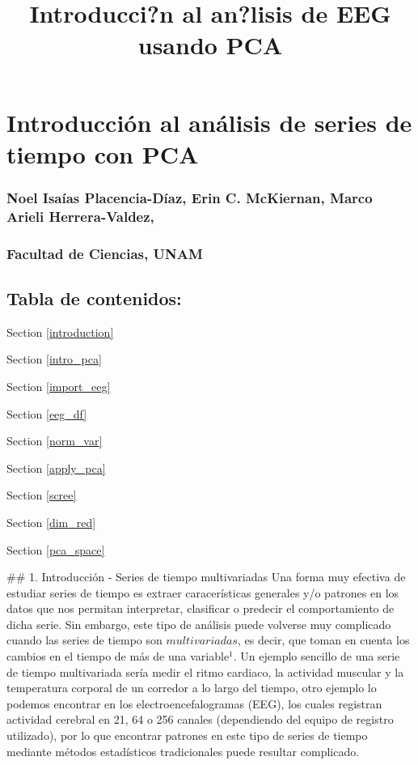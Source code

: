 \documentclass[11pt]{article}
\title{Introducci?n al an?lisis de EEG usando PCA}
\begin{document}
    
    
    \maketitle
    
    

    
    \hypertarget{introducciuxf3n-al-anuxe1lisis-de-series-de-tiempo-con-pca}{%
\section{Introducción al análisis de series de tiempo con
PCA}\label{introducciuxf3n-al-anuxe1lisis-de-series-de-tiempo-con-pca}}

\hypertarget{noel-isauxedas-placencia-duxedaz-erin-c.-mckiernan-marco-arieli-herrera-valdez}{%
\subsubsection{Noel Isaías Placencia-Díaz, Erin C. McKiernan, Marco
Arieli
Herrera-Valdez,}\label{noel-isauxedas-placencia-duxedaz-erin-c.-mckiernan-marco-arieli-herrera-valdez}}

\hypertarget{facultad-de-ciencias-unam}{%
\subsubsection{Facultad de Ciencias,
UNAM}\label{facultad-de-ciencias-unam}}

    \hypertarget{tabla-de-contenidos}{%
\subsection{Tabla de contenidos:}\label{tabla-de-contenidos}}

Section \ref{introduction}

Section \ref{intro_pca}

Section \ref{import_eeg}

Section \ref{eeg_df}

Section \ref{norm_var}

Section \ref{apply_pca}

Section \ref{scree}

Section \ref{dim_red}

Section \ref{pca_space}

     \#\# 1. Introducción - Series de tiempo multivariadas Una forma muy
efectiva de estudiar series de tiempo es extraer caracerísticas
generales y/o patrones en los datos que nos permitan interpretar,
clasificar o predecir el comportamiento de dicha serie. Sin embargo,
este tipo de análisis puede volverse muy complicado cuando las series de
tiempo son \(multivariadas\), es decir, que toman en cuenta los cambios
en el tiempo de más de una variable\(^1\). Un ejemplo sencillo de una
serie de tiempo multivariada sería medir el ritmo cardiaco, la actividad
muscular y la temperatura corporal de un corredor a lo largo del tiempo,
otro ejemplo lo podemos encontrar en los electroencefalogramas (EEG),
los cuales registran actividad cerebral en 21, 64 o 256 canales
(dependiendo del equipo de registro utilizado), por lo que encontrar
patrones en este tipo de series de tiempo mediante métodos estadísticos
tradicionales puede resultar complicado.
\end{document}
